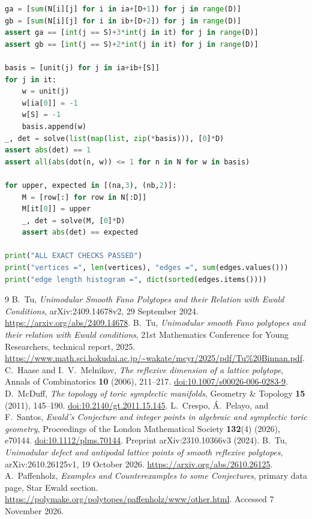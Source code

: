 \documentclass[11pt]{article}
\theoremstyle{remark}\newtheorem{remark}[theorem]{Remark}
\begin{document}
\begin{lstlisting}[language=Python]
ga = [sum(N[i][j] for i in ia+[D+1]) for j in range(D)]
gb = [sum(N[i][j] for i in ib+[D+2]) for j in range(D)]
assert ga == [int(j == S)+3*int(j in it) for j in range(D)]
assert gb == [int(j == S)+2*int(j in it) for j in range(D)]

basis = [unit(j) for j in ia+ib+[S]]
for j in it:
    w = unit(j)
    w[ia[0]] = -1
    w[S] = -1
    basis.append(w)
_, det = solve(list(map(list, zip(*basis))), [0]*D)
assert abs(det) == 1
assert all(abs(dot(n, w)) <= 1 for n in N for w in basis)

for upper, expected in [(na,3), (nb,2)]:
    M = [row[:] for row in N[:D]]
    M[it[0]] = upper
    _, det = solve(M, [0]*D)
    assert abs(det) == expected

print("ALL EXACT CHECKS PASSED")
print("vertices =", len(vertices), "edges =", sum(edges.values()))
print("edge length histogram =", dict(sorted(edges.items())))
\end{lstlisting}

\begin{thebibliography}{9}
B.~Tu, \emph{Unimodular Smooth Fano Polytopes and their Relation with
Ewald Conditions}, arXiv:2409.14678v2, 29 September 2024.
\url{https://arxiv.org/abs/2409.14678}.
B.~Tu, \emph{Unimodular smooth Fano polytopes and their relation with
Ewald conditions}, 21st Mathematics Conference for Young Researchers,
technical report, 2025.
\url{https://www.math.sci.hokudai.ac.jp/~wakate/mcyr/2025/pdf/Tu\%20Binnan.pdf}.
C.~Haase and I.~V.~Melnikov,
\emph{The reflexive dimension of a lattice polytope},
Annals of Combinatorics \textbf{10} (2006), 211--217.
\href{https://doi.org/10.1007/s00026-006-0283-9}{doi:10.1007/s00026-006-0283-9}.
D.~McDuff, \emph{The topology of toric symplectic manifolds},
Geometry \& Topology \textbf{15} (2011), 145--190.
\href{https://doi.org/10.2140/gt.2011.15.145}{doi:10.2140/gt.2011.15.145}.
L.~Crespo, \'{A}.~Pelayo, and F.~Santos,
\emph{Ewald's Conjecture and integer points in algebraic and symplectic
toric geometry},
Proceedings of the London Mathematical Society \textbf{132}(4) (2026), e70144.
\href{https://doi.org/10.1112/plms.70144}{doi:10.1112/plms.70144}.
Preprint arXiv:2310.10366v3 (2024).
B.~Tu, \emph{Unimodular defect and antipodal lattice points of smooth
reflexive polytopes}, arXiv:2610.26125v1, 19 October 2026.
\url{https://arxiv.org/abs/2610.26125}.
A.~Paffenholz, \emph{Examples and Counterexamples to some Conjectures},
primary data page, Star Ewald section.
\url{https://polymake.org/polytopes/paffenholz/www/other.html}.
Accessed 7 November 2026.
\end{thebibliography}
\end{document}
